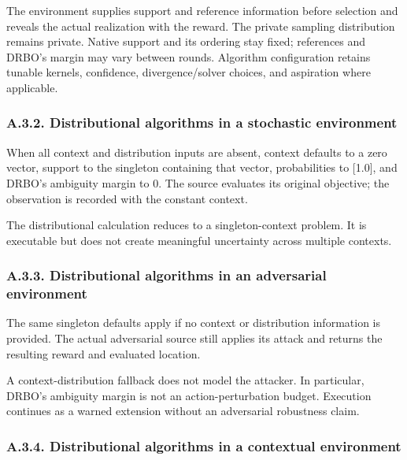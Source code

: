 \documentclass[10pt,a4paper]{article}
\begin{document}
The environment supplies support and reference information before selection and reveals the actual realization with the reward. The private sampling distribution remains private. Native support and its ordering stay fixed; references and DRBO's margin may vary between rounds. Algorithm configuration retains tunable kernels,\allowbreak{} confidence,\allowbreak{} divergence/solver choices,\allowbreak{} and aspiration where applicable.


\subsubsection*{A.3.2. Distributional algorithms in a stochastic environment}

When all context and distribution inputs are absent,\allowbreak{} context defaults to a zero vector,\allowbreak{} support to the singleton containing that vector,\allowbreak{} probabilities to [1.0],\allowbreak{} and DRBO's ambiguity margin to 0. The source evaluates its original objective; the observation is recorded with the constant context.


The distributional calculation reduces to a singleton-context problem. It is executable but does not create meaningful uncertainty across multiple contexts.


\subsubsection*{A.3.3. Distributional algorithms in an adversarial environment}

The same singleton defaults apply if no context or distribution information is provided. The actual adversarial source still applies its attack and returns the resulting reward and evaluated location.


A context-distribution fallback does not model the attacker. In particular,\allowbreak{} DRBO's ambiguity margin is not an action-perturbation budget. Execution continues as a warned extension without an adversarial robustness claim.


\subsubsection*{A.3.4. Distributional algorithms in a contextual environment}
\end{document}
